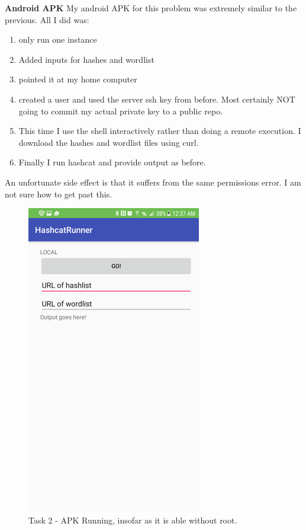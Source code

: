 \documentclass{article}
\begin{document}
\textbf{Android APK}
My android APK for this problem was extremely similar to the previous. All I did was:
\begin{enumerate}
\item only run one instance
\item Added inputs for hashes and wordlist
\item pointed it at my home computer
\item created a user and used the server ssh key from before. Most certainly NOT going to commit my actual private key to a public repo.
\item This time I use the shell interactively rather than doing a remote execution. I download the hashes and wordlist files using curl.
\item Finally I run hashcat and provide output as before.
\end{enumerate}
An unfortunate side effect is that it suffers from the same permissions error. I am not sure how to get past this.

	\begin{figure}[ht]
        \centerline{
            \includegraphics[width=3in]{img/t2s1.png}
        }
		\centering
		\caption{Task 2 - APK Running, insofar as it is able without root.}
	\end{figure}
	\clearpage
\end{document}
